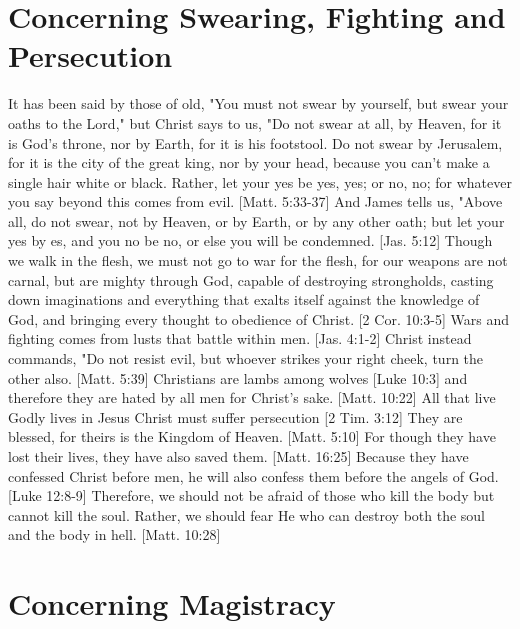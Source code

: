 \documentclass[../main.tex]{subfiles}
\begin{document}
	\section{Concerning Swearing, Fighting and Persecution}

	It has been said by those of old, "You must not swear by yourself, but swear your oaths to the Lord," but Christ says to us, "Do not swear at all, by Heaven, for it is God's throne, nor by Earth, for it is his footstool. Do not swear by Jerusalem, for it is the city of the great king, nor by your head, because you can't make a single hair white or black. Rather, let your yes be yes, yes; or no, no; for whatever you say beyond this comes from evil. [Matt. 5:33-37] And James tells us, "Above all, do not swear, not by Heaven, or by Earth, or by any other oath; but let your yes by es, and you no be no, or else you will be condemned. [Jas. 5:12] Though we walk in the flesh, we must not go to war for the flesh, for our weapons are not carnal, but are mighty through God, capable of destroying strongholds, casting down imaginations and everything that exalts itself against the knowledge of God, and bringing every thought to obedience of Christ. [2 Cor. 10:3-5] Wars and fighting comes from lusts that battle within men. [Jas. 4:1-2] Christ instead commands, "Do not resist evil, but whoever strikes your right cheek, turn the other also. [Matt. 5:39] Christians are lambs among wolves [Luke 10:3] and therefore they are hated by all men for Christ's sake. [Matt. 10:22] All that live Godly lives in Jesus Christ must suffer persecution [2 Tim. 3:12] They are blessed, for theirs is the Kingdom of Heaven. [Matt. 5:10] For though they have lost their lives, they have also saved them. [Matt. 16:25] Because they have confessed Christ before men, he will also confess them before the angels of God. [Luke 12:8-9] Therefore, we should not be afraid of those who kill the body but cannot kill the soul. Rather, we should fear He who can destroy both the soul and the body in hell. [Matt. 10:28]

	\section{Concerning Magistracy}
\end{document}
